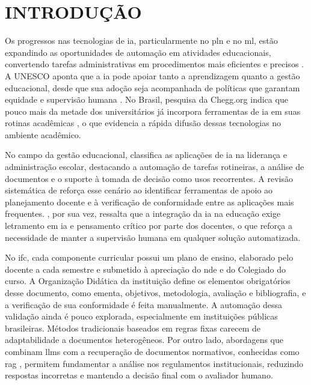 \chapter{INTRODUÇÃO}
Os progressos nas tecnologias de \gls{ia}, particularmente no \gls{pln} e no \gls{ml}, estão expandindo as oportunidades de automação em atividades educacionais, convertendo tarefas administrativas em procedimentos mais eficientes e precisos \cite{ADIGUZEL2023}. A UNESCO aponta que a \gls{ia} pode apoiar tanto a aprendizagem quanto a gestão educacional, desde que sua adoção seja acompanhada de políticas que garantam equidade e supervisão humana \cite{Pedro2019}. No Brasil, pesquisa da Chegg.org indica que pouco mais da metade dos universitários já incorpora ferramentas de \gls{ia} em suas rotinas acadêmicas \cite{CNNBrasil2023}, o que evidencia a rápida difusão dessas tecnologias no ambiente acadêmico.

No campo da gestão educacional,  classifica as aplicações de \gls{ia} na liderança e administração escolar, destacando a automação de tarefas rotineiras, a análise de documentos e o suporte à tomada de decisão como usos recorrentes. A revisão sistemática de  reforça esse cenário ao identificar ferramentas de apoio ao planejamento docente e à verificação de conformidade entre as aplicações mais frequentes. , por sua vez, ressalta que a integração da \gls{ia} na educação exige letramento em \gls{ia} e pensamento crítico por parte dos docentes, o que reforça a necessidade de manter a supervisão humana em qualquer solução automatizada.

No \gls{ifc}, cada componente curricular possui um plano de ensino, elaborado pelo docente a cada semestre e submetido à apreciação do \gls{nde} e do Colegiado do curso. A Organização Didática da instituição \cite{ifc2022} define os elementos obrigatórios desse documento, como ementa, objetivos, metodologia, avaliação e bibliografia, e a verificação de sua conformidade é feita manualmente. A automação dessa validação ainda é pouco explorada, especialmente em instituições públicas brasileiras. Métodos tradicionais baseados em regras fixas carecem de adaptabilidade a documentos heterogêneos. Por outro lado, abordagens que combinam \glspl{llm} com a recuperação de documentos normativos, conhecidas como \gls{rag} \cite{lewis2020}, permitem fundamentar a análise nos regulamentos institucionais, reduzindo respostas incorretas e mantendo a decisão final com o avaliador humano.

